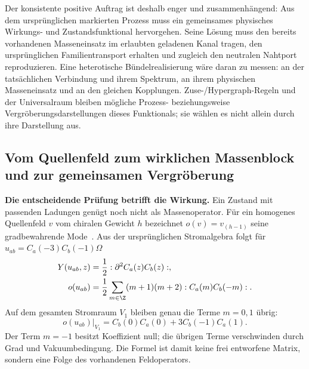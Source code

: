 Der konsistente positive Auftrag ist deshalb enger und zusammenhängend: Aus dem ursprünglichen markierten Prozess muss ein gemeinsames physisches Wirkungs- und Zustandsfunktional hervorgehen. Seine Lösung muss den bereits vorhandenen Masseneinsatz im erlaubten geladenen Kanal tragen, den ursprünglichen Familientransport erhalten und zugleich den neutralen Nahtport reproduzieren. Eine heterotische Bündelrealisierung wäre daran zu messen: an der tatsächlichen Verbindung und ihrem Spektrum, an ihrem physischen Masseneinsatz und an den gleichen Kopplungen. Zuse-/Hypergraph-Regeln und der Universalraum bleiben mögliche Prozess- beziehungsweise Vergröberungsdarstellungen dieses Funktionals; sie wählen es nicht allein durch ihre Darstellung aus.


\subsection{Vom Quellenfeld zum wirklichen Massenblock und zur gemeinsamen Vergröberung}\label{sec:masszeromode}

\textbf{Die entscheidende Prüfung betrifft die Wirkung.}
Ein Zustand mit passenden Ladungen genügt noch nicht als Massenoperator.
Für ein homogenes Quellenfeld $v$ vom chiralen Gewicht $h$ bezeichnet
$o(v)=v_{(h-1)}$ seine gradbewahrende Mode~\cite{dongradical}.
Aus der ursprünglichen Stromalgebra folgt für
$u_{ab}=C_a(-3)C_b(-1)\Omega$
\begin{align}
Y(u_{ab},z)&=\frac12:\partial^2 C_a(z)C_b(z):,\\
o(u_{ab})&=\frac12\sum_{m\in\Z}(m+1)(m+2)
 :C_a(m)C_b(-m):.
\end{align}
Auf dem gesamten Stromraum $V_1$ bleiben genau die Terme $m=0,1$ übrig:
\begin{equation}\label{eq:massmodeexact}
\boxed{o(u_{ab})\big|_{V_1}=C_b(0)C_a(0)+3C_b(-1)C_a(1).}
\end{equation}
Der Term $m=-1$ besitzt Koeffizient null; die übrigen Terme verschwinden
durch Grad und Vakuumbedingung. Die Formel ist damit keine frei entworfene
Matrix, sondern eine Folge des vorhandenen Feldoperators.


